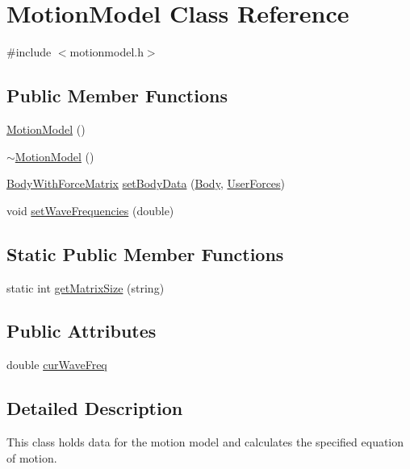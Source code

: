 \hypertarget{class_motion_model}{\section{Motion\-Model Class Reference}
\label{class_motion_model}
}


{\ttfamily \#include $<$motionmodel.\-h$>$}

\subsection*{Public Member Functions}
\begin{DoxyCompactItemize}
\item 
\hyperlink{class_motion_model_a5a5e4bba0f6ca24e1fdd316458f4f824}{Motion\-Model} ()
\item 
\hyperlink{class_motion_model_ac48a359c77d9efe39d4ec8c9e862a1cd}{$\sim$\-Motion\-Model} ()
\item 
\hyperlink{class_body_with_force_matrix}{Body\-With\-Force\-Matrix} \hyperlink{class_motion_model_ad70067e7f0e5b12978f1dc7f1722c2e1}{set\-Body\-Data} (\hyperlink{class_body}{Body}, \hyperlink{class_user_forces}{User\-Forces})
\item 
void \hyperlink{class_motion_model_ae57d6c22a960aa559bfdc16ca4737a0b}{set\-Wave\-Frequencies} (double)
\end{DoxyCompactItemize}
\subsection*{Static Public Member Functions}
\begin{DoxyCompactItemize}
\item 
static int \hyperlink{class_motion_model_a6eb1d5de348da32ae03936030eba4f2b}{get\-Matrix\-Size} (string)
\end{DoxyCompactItemize}
\subsection*{Public Attributes}
\begin{DoxyCompactItemize}
\item 
double \hyperlink{class_motion_model_af8980ee05f544c75ec1ebe551045c261}{cur\-Wave\-Freq}
\end{DoxyCompactItemize}


\subsection{Detailed Description}
This class holds data for the motion model and calculates the specified equation of motion. 

